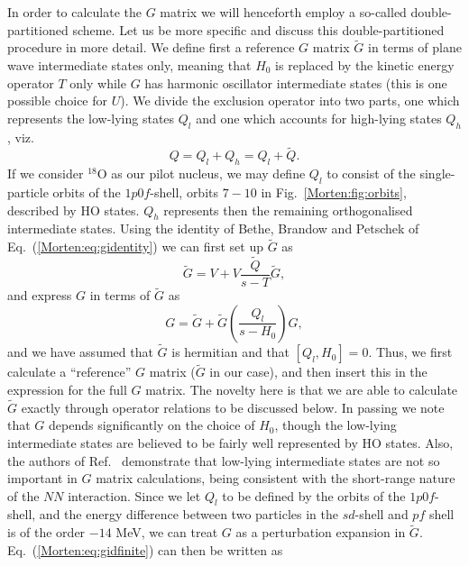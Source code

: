 In order to calculate the $G$ matrix we will henceforth employ a 
so-called double-partitioned scheme. 
Let us be more specific and discuss this double-partitioned procedure
in more detail.  We define first a reference $G$ matrix $\tilde{G}$ in
terms of plane wave intermediate states only, meaning that $H_0$ is
replaced by the kinetic energy operator $T$ only while $G$ has
harmonic oscillator intermediate states (this is one possible choice
for $U$). We divide the exclusion operator into two parts, one which
represents the low-lying states $Q_l$ and one which accounts for
high-lying states $Q_h$, viz.
\[
    Q=Q_l+Q_h=Q_l+\tilde{Q}.
\]
If we consider $^{18}$O as our pilot nucleus, we may define $Q_l$ to
consist of the single-particle orbits of the $1p0f$-shell, orbits $7-10$ in
Fig.~\ref{Morten:fig:orbits}, described by HO states. $Q_h$
represents then the remaining orthogonalised intermediate states.
Using the identity of Bethe, Brandow and Petschek \cite{Morten:bbp63}
of Eq.~(\ref{Morten:eq:gidentity}) we can first set up $\tilde{G}$ as
\begin{equation}
     \tilde{G}=V+V\frac{\tilde{Q}}{s -T}\tilde{G},
\label{Morten:eq:gfinite}
\end{equation}
and  express $G$ in terms of $\tilde{G}$ as
\begin{equation}
        G=\tilde{G} +\tilde{G}
        \left(\frac{Q_l}{s -H_0}\right)G,
        \label{Morten:eq:gidfinite}
\end{equation}
and we have assumed that $\tilde{G}$ is hermitian and that $[Q_l,H_0]=0$.
Thus, we first calculate
a ``reference'' $G$ matrix ($\tilde{G}$ in our case), and then insert this
in the expression for the full $G$ matrix. The novelty here is that
we are able to calculate $\tilde{G}$ exactly through operator relations
to be discussed below. In passing we note that $G$ depends significantly 
on the choice of $H_0$, though the low-lying intermediate states
are believed to be fairly well represented by HO states. 
Also, the authors of Ref.~ demonstrate that low-lying
intermediate states are not so important in $G$ matrix calculations,
being consistent with the short-range nature of the $NN$ interaction.
Since we let $Q_l$ to be defined by the orbits of the $1p0f$-shell,
and the energy difference between two particles in the 
$sd$-shell and $pf$ shell is of the order $-14$ MeV, we can treat 
$G$ as a perturbation expansion in $\tilde{G}$.
Eq.~(\ref{Morten:eq:gidfinite}) can then be written as 
